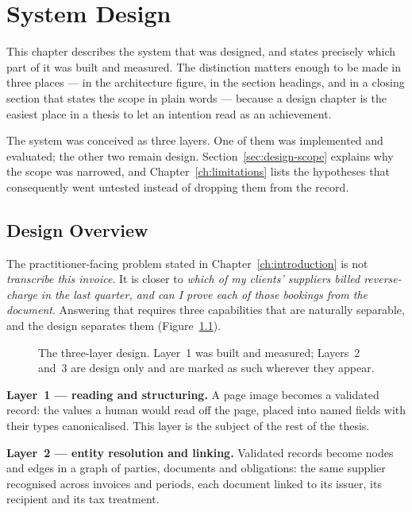 \chapter{System Design}
\label{ch:system-design}

This chapter describes the system that was designed, and states precisely which part of it
was built and measured. The distinction matters enough to be made in three places --- in
the architecture figure, in the section headings, and in a closing section that states the
scope in plain words --- because a design chapter is the easiest place in a thesis to let an
intention read as an achievement.

The system was conceived as three layers. One of them was implemented and evaluated; the
other two remain design. Section~\ref{sec:design-scope} explains why the scope was narrowed, and
Chapter~\ref{ch:limitations} lists the hypotheses that consequently went
untested instead of dropping them from the record.

\section{Design Overview}
\label{sec:design-overview}

The practitioner-facing problem stated in Chapter~\ref{ch:introduction} is not
\emph{transcribe this invoice}. It is closer to \emph{which of my clients' suppliers billed
reverse-charge in the last quarter, and can I prove each of those bookings from the
document}. Answering that requires three capabilities that are naturally separable, and the
design separates them (Figure~\ref{fig:architecture}).

\begin{figure}[htbp]
  \centering
  
  \caption[The three-layer design]{The three-layer design. Layer~1 was built and measured;
  Layers~2 and~3 are design only and are marked as such wherever they appear.}
  \label{fig:architecture}
\end{figure}

\textbf{Layer~1 --- reading and structuring.} A page image becomes a validated record: the
values a human would read off the page, placed into named fields with their types
canonicalised. This layer is the subject of the rest of the thesis.

\textbf{Layer~2 --- entity resolution and linking.} Validated records become nodes and edges
in a graph of parties, documents and obligations: the same supplier recognised across
invoices and periods, each document linked to its issuer, its recipient and its tax
treatment.

